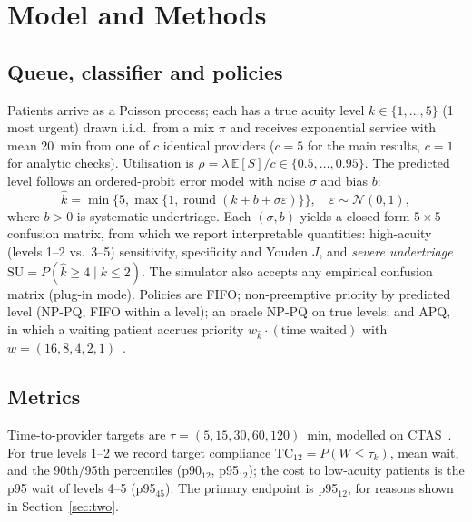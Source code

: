 \documentclass[conference]{IEEEtran}
\begin{document}
\section{Model and Methods}\label{sec:model}

\subsection{Queue, classifier and policies}
Patients arrive as a Poisson process; each has a true acuity level $k\in\{1,\dots,5\}$
(1 most urgent) drawn i.i.d.\ from a mix $\pi$ and receives exponential service with
mean 20~min from one of $c$ identical providers ($c=5$ for the main results, $c=1$ for
analytic checks). Utilisation is $\rho=\lambda\,\mathbb{E}[S]/c\in\{0.5,\dots,0.95\}$.
The predicted level follows an ordered-probit error model with noise $\sigma$ and bias $b$:
\begin{equation}
\hat k=\min\{5,\max\{1,\operatorname{round}(k+b+\sigma\varepsilon)\}\},\quad
\varepsilon\sim\mathcal N(0,1),
\end{equation}
where $b>0$ is systematic undertriage. Each $(\sigma,b)$ yields a closed-form $5\times5$
confusion matrix, from which we report interpretable quantities: high-acuity
(levels 1--2 vs.\ 3--5) sensitivity, specificity and Youden $J$, and
\emph{severe undertriage} $\mathrm{SU}=P(\hat k\ge4\mid k\le2)$. The simulator also
accepts any empirical confusion matrix (plug-in mode).
Policies are FIFO; non-preemptive priority by predicted level (NP-PQ, FIFO within a level);
an oracle NP-PQ on true levels; and APQ, in which a waiting patient accrues priority
$w_{\hat k}\cdot(\text{time waited})$ with $w=(16,8,4,2,1)$~\cite{kleinrock1964delay,stanford2014apq}.

\subsection{Metrics}
Time-to-provider targets are $\tau=(5,15,30,60,120)$~min, modelled on
CTAS~\cite{bullard2017ctas}. For true levels 1--2 we record target compliance
$\mathrm{TC}_{12}=P(W\le\tau_k)$, mean wait, and the 90th/95th percentiles
(p90$_{12}$, p95$_{12}$); the cost to low-acuity patients is the p95 wait of levels 4--5
(p95$_{45}$). The primary endpoint is p95$_{12}$, for reasons shown in
Section~\ref{sec:two}.
\end{document}
